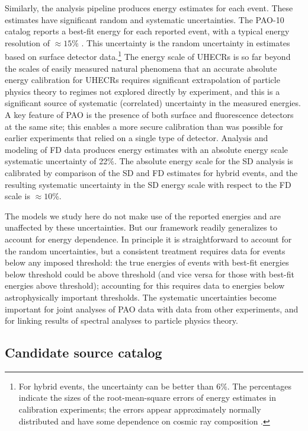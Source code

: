 Similarly, the analysis pipeline produces energy estimates for each event.
These estimates have significant random and systematic uncertainties.
The PAO-10 catalog reports a best-fit energy for each reported event,
with a typical energy resolution of $\approx 15$\% \cite{PAO10-GZK}.
This uncertainty is the random uncertainty in estimates based on surface
detector data.\footnote{For hybrid events, the uncertainty can be better than
6\%.  The percentages indicate the sizes of the root-mean-square errors of
energy estimates in calibration experiments; the errors appear approximately
normally distributed and have some dependence on cosmic ray composition
\cite{PAO08-GZK}.}
The energy scale of UHECRs is so far beyond the scales of easily measured
natural phenomena that an accurate absolute energy calibration for UHECRs
requires significant extrapolation of particle physics theory to regimes not
explored directly by experiment, and this is a significant source of
systematic (correlated) uncertainty in the measured energies.  A key feature
of PAO is the presence of both surface and fluorescence detectors at the same
site; this enables a more secure calibration than was possible for earlier
experiments that relied on a single type of detector.  Analysis and modeling
of FD data produces energy estimates with an absolute energy scale systematic
uncertainty of 22\%.  The absolute energy scale for the SD analysis is calibrated by
comparison of the SD and FD estimates for hybrid events, and the resulting
systematic uncertainty in the SD energy scale with respect to the FD scale is
$\approx 10$\%.

The models we study here do not make use of the reported energies and are
unaffected by these uncertainties.  But our framework readily generalizes to
account for energy dependence.  In principle it is straightforward to account
for the random uncertainties, but a consistent treatment requires data for
events below any imposed threshold:  the true energies of events with best-fit
energies below threshold could be above threshold (and vice versa for those
with best-fit energies above threshold); accounting for this requires data to
energies below astrophysically important thresholds.  The systematic
uncertainties become important for joint analyses of PAO data with data from
other experiments, and for linking results of spectral analyses to particle
physics theory.


\subsection{Candidate source catalog}

